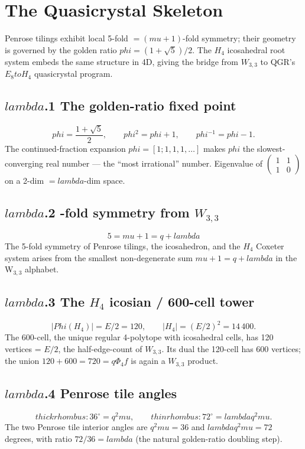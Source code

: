 \documentclass[12pt,a4paper]{article}
\def\text#1{#1}%
\def\lambda{lambda}%
\def\mu{mu}%
\def\phi{phi}%
\def\Phi#1{Phi#1}%
\def\to{ to }%
\theoremstyle{definition}
\begin{document}
\section*{The Quasicrystal Skeleton}

Penrose tilings exhibit local 5-fold $= (\mu+1)$-fold symmetry; their
geometry is governed by the golden ratio $\phi = (1+\sqrt{5})/2$. The
$H_4$ icosahedral root system embeds the same structure in 4D, giving
the bridge from $W_{3,3}$ to QGR's $E_8 \to H_4$ quasicrystal program.

\subsection*{$\lambda$.1 \quad The golden-ratio fixed point}
\[
\phi = \frac{1+\sqrt{5}}{2},\qquad \phi^2 = \phi + 1,\qquad \phi^{-1} = \phi - 1.
\]
The continued-fraction expansion $\phi = [1;1,1,1,\ldots]$ makes $\phi$
the slowest-converging real number — the ``most irrational'' number.
Eigenvalue of $\begin{pmatrix}1 & 1\\ 1 & 0\end{pmatrix}$ on a 2-dim $=
\lambda$-dim space.

\subsection*{$\lambda$.2 -fold symmetry from $W_{3,3}$}
\[
\boxed{\;5 = \mu + 1 = q + \lambda\;}
\]
The 5-fold symmetry of Penrose tilings, the icosahedron, and the $H_4$
Coxeter system arises from the smallest non-degenerate sum
$\mu + 1 = q + \lambda$ in the W$_{3,3}$ alphabet.

\subsection*{$\lambda$.3 \quad The $H_4$ icosian / 600-cell tower}
\[
|\Phi(H_4)| = E/2 = 120,\qquad |H_4| = (E/2)^2 = 14\,400.
\]
The 600-cell, the unique regular 4-polytope with icosahedral cells,
has 120 vertices = $E/2$, the half-edge-count of $W_{3,3}$. Its dual
the 120-cell has 600 vertices; the union $120 + 600 = 720 = q\Phi_4 f$
is again a $W_{3,3}$ product.

\subsection*{$\lambda$.4 \quad Penrose tile angles}
\[
\text{thick rhombus}: 36^\circ = q^2\mu,\qquad \text{thin rhombus}: 72^\circ = \lambda q^2 \mu.
\]
The two Penrose tile interior angles are
$q^2\mu = 36$ and $\lambda q^2 \mu = 72$ degrees, with ratio
$72/36 = \lambda$ (the natural golden-ratio doubling step).
\end{document}
